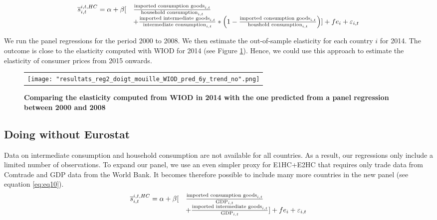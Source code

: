 \documentclass[11pt,a4paper]{article}
\begin{document}
 \begin{equation}
\begin{array}{llll}
\overline{s}_{i,t}^{i,t,HC}= \alpha +  \beta  [&\frac{\textnormal{imported consumption goods}_{i,t}}{\textnormal{household consumption}_{i,t}} \\ & + \frac{\textnormal{imported intermediate goods}_{i,t}}{\textnormal{intermediate consumption}_{i,t}}*\left(1-\frac{\textnormal{imported consumption goods}_{i,t}}{\textnormal{houshold consumption}_{i,t}}\right)] +fe_{i}+\varepsilon_{i,t}
\end{array}
\label{eq:eq9}
\end{equation}

We run the panel regressions for the period 2000 to 2008.
We then estimate the out-of-sample elasticity for each country $i$ for 2014. 
The outcome is close to the elasticity computed with WIOD for 2014 (see Figure \ref{fig:panel_pred1}).
Hence, we could use this approach to estimate the elasticity of consumer prices from 2015 onwards.

\begin{figure}[!h]
	\centering
	\caption{\footnotesize{\textbf{Comparing the elasticity computed from WIOD in 2014 with the one predicted from a panel regression between 2000 and 2008}}}
	\begin{tabular}{c}
		\texttt{[image: "resultats\_reg2\_doigt\_mouille\_WIOD\_pred\_6y\_trend\_no".png]}\\
	\end{tabular}
	\label{fig:panel_pred1}
\end{figure}

\subsection{Doing without Eurostat}
Data on intermediate consumption and household consumption are not available for all countries.
As a result, our regressions only include a limited number of observations.
To expand our panel, we use an even simpler proxy for E1HC+E2HC that requires only trade data from Comtrade and GDP data from the World Bank. 
It becomes therefore possible to include many more countries in the new panel (see equation \ref{eq:eq10}).
 \begin{equation}
\begin{array}{llll}
\overline{s}_{i,t}^{i,t,HC}= \alpha +  \beta  [&\frac{\textnormal{imported consumption goods}_{i,t}}{\textnormal{GDP}_{i,t}} \\ & + \frac{\textnormal{imported intermediate goods}_{i,t}}{\textnormal{GDP}_{i,t}}] +fe_{i}+\varepsilon_{i,t}
\end{array}
\label{eq:eq10}
\end{equation}
\end{document}
